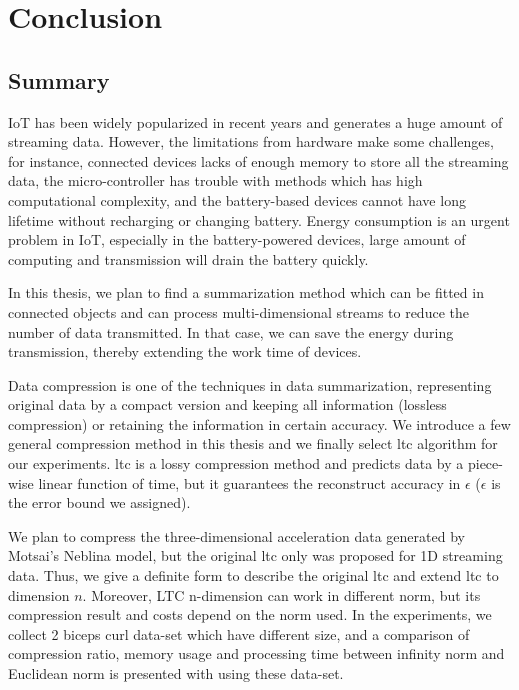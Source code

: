 \chapter{Conclusion}


\section{Summary}


IoT has been widely popularized in recent years and generates a huge amount of
streaming data. However, the limitations from hardware make some challenges, for
instance, connected devices lacks of enough memory to store all the streaming
data, the micro-controller has trouble with methods which has high computational
complexity, and the battery-based devices cannot have long lifetime without
recharging or changing battery. Energy consumption is an urgent problem in IoT,
especially in the battery-powered devices, large amount of computing and
transmission will drain the battery quickly.

In this thesis, we plan to find a summarization method which can be fitted in
connected objects and can process multi-dimensional streams to reduce the number
of data transmitted. In that case, we can save the energy during transmission,
thereby extending the work time of devices.

Data compression is one of the techniques in data summarization, representing
original data by a compact version and keeping all information (lossless
compression) or retaining the information in certain accuracy. We introduce a
few general compression method in this thesis and we finally select
\acrfull{ltc} algorithm for our experiments. \acrshort{ltc} is a lossy
compression method and predicts data by a piece-wise linear function of time,
but it guarantees the reconstruct accuracy in $\epsilon$ ($\epsilon$ is the
error bound we assigned). 

We plan to compress the three-dimensional acceleration data generated by
Motsai's Neblina model, but the original \acrshort{ltc} only was proposed for 1D
streaming data. Thus, we give a definite form to describe the original
\acrshort{ltc} and extend \acrshort{ltc} to dimension $n$. Moreover, LTC
n-dimension can work in different norm, but its compression result and costs
depend on the norm used. In the experiments, we collect 2 biceps curl data-set
which have different size, and a comparison of compression ratio, memory usage
and processing time between infinity norm and Euclidean norm is presented with
using these data-set.

